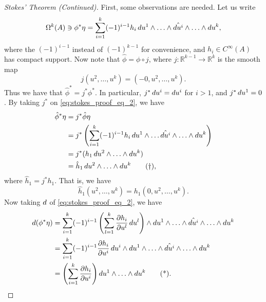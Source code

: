 \documentclass[notoc,notitlepage]{tufte-book}
\begin{document}
\begin{proof}[Stokes' Theorem (Continued)]
  First, some observations are needed. Let us write
  \begin{equation}\label{eq:stokes_proof_eq_2}
    \Omega^k(A) \ni \phi^* \eta = \sum_{i=1}^{k} (-1)^{i-1} h_i \mathop{}\!d{u^1} \land
    \hdots \land \hat{\mathop{}\!d{u^i}} \land \hdots \land \mathop{}\!d{u^k},
  \end{equation}
  where the $(-1)^{i-1}$ instead of $(-1)^{k-1}$ for convenience, and $h_i \in
  C^\infty(A)$ has compact support. Now note that  $\hat{\phi} = \phi \circ j$,
  where $j : \mathbb{R}^{k-1} \to \mathbb{R}^k$ is the smooth map
  \begin{equation*}
    j(u^2, \ldots, u^k) = (-0, u^2, \ldots, u^k).
  \end{equation*}
  Thus we have that $\hat{\phi}^* = j^* \phi^*$. In particular, $j^* \mathop{}\!d{u^i} =
  \mathop{}\!d{u^i}$ for $i > 1$, and $j^* \mathop{}\!d{u^1} = 0$. By taking $j^*$ on
  \cref{eq:stokes_proof_eq_2}, we have
  \begin{align*}
    \hat{\phi}^* \eta &= j^* \hat{\phi} \eta \\
                      &= j^* \left( \sum_{i=1}^{k} (-1)^{i-1} h_i \mathop{}\!d{u^1}
                      \land \hdots \hat{\mathop{}\!d{u^i}} \land \hdots \land \mathop{}\!d{u^k}
                    \right) \\
                      &= j^*(h_1 \mathop{}\!d{u^2} \land \hdots \land \mathop{}\!d{u^k}) \\
                      &= \hat{h}_1 \mathop{}\!d{u^2} \land \hdots \land \mathop{}\!d{u^k}
                      \tag{$\dagger$}\label{eq:stokes_proof_eq_3},
  \end{align*}
  where $\hat{h}_1 = j^* h_1$. That is, we have
  \begin{equation*}
    \hat{h}_1(u^2, \ldots, u^k) = h_1(0, u^2, \ldots, u^k).
  \end{equation*}
  Now taking $\mathop{}\!d{}$ of \cref{eq:stokes_proof_eq_2}, we have
  \begin{align*}
    \dif{(\phi^* \eta)}
    &= \sum_{i=1}^{k} (-1)^{i-1} \left( \sum_{l=1}^{k} \frac{\partial
      h_i}{\partial u^l} \dif{u^l} \right) \land \dif{u^1} \land \hdots \land
      \hat{\dif{u^i}} \land \hdots \land \dif{u^k} \\
    &= \sum_{i=1}^{k} (-1)^{i-1} \frac{\partial h_i}{\partial u^i} \dif{u^i}
      \land \dif{u^1} \land \hdots \land \hat{\dif{u^i}} \land \hdots \land
      \dif{u^k} \\
    &= \left( \sum_{i=1}^{k} \frac{\partial h_i}{\partial u^i} \right) \dif{u^1}
      \land \hdots \land \dif{u^k} \tag{*}\label{eq:stokes_proof_eq_4}.
  \end{align*}


\end{proof}
\end{document}
